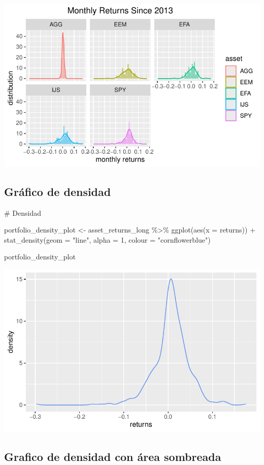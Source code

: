\documentclass[
  letterpaper,
  DIV=11,
  numbers=noendperiod]{scrartcl}
\newenvironment{Shaded}{\begin{snugshade}}{\end{snugshade}}
\newcommand{\AttributeTok}[1]{\textcolor[rgb]{0.40,0.45,0.13}{#1}}
\newcommand{\CommentTok}[1]{\textcolor[rgb]{0.37,0.37,0.37}{#1}}
\newcommand{\DecValTok}[1]{\textcolor[rgb]{0.68,0.00,0.00}{#1}}
\newcommand{\FunctionTok}[1]{\textcolor[rgb]{0.28,0.35,0.67}{#1}}
\newcommand{\NormalTok}[1]{\textcolor[rgb]{0.00,0.23,0.31}{#1}}
\newcommand{\OtherTok}[1]{\textcolor[rgb]{0.00,0.23,0.31}{#1}}
\newcommand{\SpecialCharTok}[1]{\textcolor[rgb]{0.37,0.37,0.37}{#1}}
\newcommand{\StringTok}[1]{\textcolor[rgb]{0.13,0.47,0.30}{#1}}
\begin{document}
\includegraphics[width=0.4\linewidth,height=\textheight,keepaspectratio]{notebook_optimization_test_files/figure-pdf/unnamed-chunk-15-1.pdf}

\subsection{Gráfico de densidad}\label{gruxe1fico-de-densidad}

\begin{Shaded}
\begin{Highlighting}[]
\CommentTok{\# Densidad}

\NormalTok{portfolio\_density\_plot }\OtherTok{\textless{}{-}}
\NormalTok{  asset\_returns\_long }\SpecialCharTok{\%\textgreater{}\%}
  \FunctionTok{ggplot}\NormalTok{(}\FunctionTok{aes}\NormalTok{(}\AttributeTok{x =}\NormalTok{ returns)) }\SpecialCharTok{+}
  \FunctionTok{stat\_density}\NormalTok{(}\AttributeTok{geom =} \StringTok{"line"}\NormalTok{,}
               \AttributeTok{alpha =} \DecValTok{1}\NormalTok{,}
               \AttributeTok{colour =} \StringTok{"cornflowerblue"}\NormalTok{)}

\NormalTok{portfolio\_density\_plot}
\end{Highlighting}
\end{Shaded}

\includegraphics[width=0.4\linewidth,height=\textheight,keepaspectratio]{notebook_optimization_test_files/figure-pdf/unnamed-chunk-16-1.pdf}

\subsection{Grafico de densidad con área
sombreada}\label{grafico-de-densidad-con-uxe1rea-sombreada}
\end{document}
